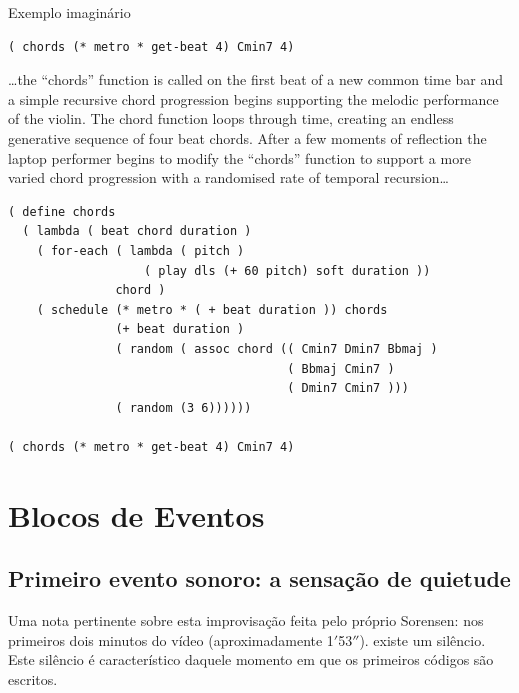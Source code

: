 \begin{example}{Exemplo imaginário}
\begin{verbatim}
( chords (* metro * get-beat 4) Cmin7 4)
\end{verbatim}

\begin{citacao}
{\ldots the “chords” function is called on the first beat of a new common time bar and a simple recursive chord progression begins supporting the melodic performance of the violin. The chord function loops through time, creating an endless generative sequence of four beat chords. After a few moments of reflection the laptop performer begins to modify the “chords” function to support a more varied chord progression with a randomised rate of temporal recursion\ldots}
\end{citacao}

\begin{verbatim}
( define chords
  ( lambda ( beat chord duration )
    ( for-each ( lambda ( pitch )
                   ( play dls (+ 60 pitch) soft duration ))
               chord )
    ( schedule (* metro * ( + beat duration )) chords
               (+ beat duration )
               ( random ( assoc chord (( Cmin7 Dmin7 Bbmaj )
                                       ( Bbmaj Cmin7 )
                                       ( Dmin7 Cmin7 )))
               ( random (3 6))))))

( chords (* metro * get-beat 4) Cmin7 4)
\end{verbatim}
\end{example}

\section{Blocos de Eventos}\label{sec:eventos}

\subsection{Primeiro evento sonoro: a sensação de quietude}\label{sec:silencio}

Uma nota pertinente sobre esta improvisação feita pelo próprio Sorensen: nos primeiros dois minutos do vídeo (aproximadamente 1$'$53$''$). existe um silêncio. Este silêncio é característico daquele momento em que os primeiros códigos são escritos.

